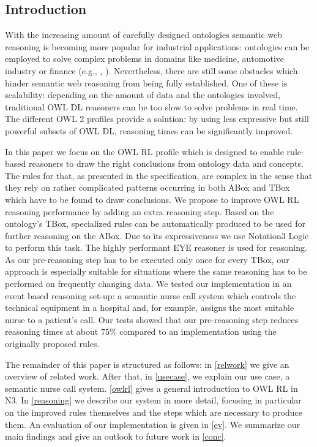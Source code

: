 \subsection{Introduction}
With the increasing amount of
 carefully designed ontologies
semantic web reasoning is becoming more popular for industrial applications:  
ontologies can be employed to solve complex problems in domains like medicine, automotive industry 
or finance (e.g., \cite{finance}, \cite{snomed2}). 
Nevertheless, there are still some obstacles which hinder semantic web reasoning from being fully established. One of these is scalability: 
depending on the amount of data and the ontologies involved, traditional OWL DL reasoners can be too slow
to solve 
problems in real time. The different OWL 2 profiles \cite{OWLRL} provide a solution: by
using less expressive but still powerful subsets of OWL DL, reasoning times can be significantly improved.

In this paper we focus on the OWL RL profile which 
is designed to enable rule-based reasoners
to draw the right conclusions from ontology data and concepts. 
The rules for that, as presented in the specification, are complex 
in the sense that they rely on rather complicated patterns occurring in both ABox and TBox which have to be found to draw conclusions.
We propose to improve 
OWL RL reasoning performance 
by adding an extra reasoning 
step. Based on the ontology's TBox, specialized rules can be automatically 
produced to be used for further reasoning on the ABox. 
Due to its expressiveness we use Notation3 Logic \cite{N3Logic} to perform this task.
The highly performant
EYE reasoner \cite{eyepaper} 
is used for reasoning.
As our pre-reasoning step has to be executed only once for every TBox, our approach is especially suitable for situations where the 
same reasoning has to be performed on frequently changing data. We %
tested our implementation in an event based reasoning set-up: a semantic
nurse call system which controls the technical equipment in a hospital and, for example, assigns the most suitable nurse to a patient's call.
Our tests showed that our pre-reasoning step reduces reasoning times at about 75\% compared to an implementation using the originally proposed rules.



The remainder of this paper is structured as follows: in \cref{relwork} we give an overview of related work. After that, in \cref{usecase}, we explain 
our use case, a semantic nurse call system. \cref{owlrl} gives a general introduction to OWL RL in N3. In \cref{reasoning} we describe our system in more detail, 
focusing in particular on the improved rules themselves and 
 the steps which are necessary to produce them. An evaluation of our implementation is given in \cref{ev}. We summarize our main findings and 
give an outlook to future work in \cref{conc}.


